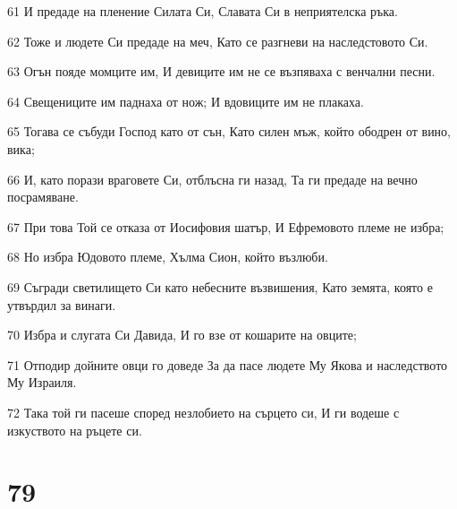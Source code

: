 \par 61 И предаде на пленение Силата Си, Славата Си в неприятелска ръка.
\par 62 Тоже и людете Си предаде на меч, Като се разгневи на наследстовото Си.
\par 63 Огън пояде момците им, И девиците им не се възпяваха с венчални песни.
\par 64 Свещениците им паднаха от нож; И вдовиците им не плакаха.
\par 65 Тогава се събуди Господ като от сън, Като силен мъж, който ободрен от вино, вика;
\par 66 И, като порази враговете Си, отблъсна ги назад, Та ги предаде на вечно посрамяване.
\par 67 При това Той се отказа от Иосифовия шатър, И Ефремовото племе не избра;
\par 68 Но избра Юдовото племе, Хълма Сион, който възлюби.
\par 69 Съгради светилището Си като небесните възвишения, Като земята, която е утвърдил за винаги.
\par 70 Избра и слугата Си Давида, И го взе от кошарите на овците;
\par 71 Отподир дойните овци го доведе За да пасе людете Му Якова и наследството Му Израиля.
\par 72 Така той ги пасеше според незлобието на сърцето си, И ги водеше с изкуството на ръцете си.

\chapter{79}

